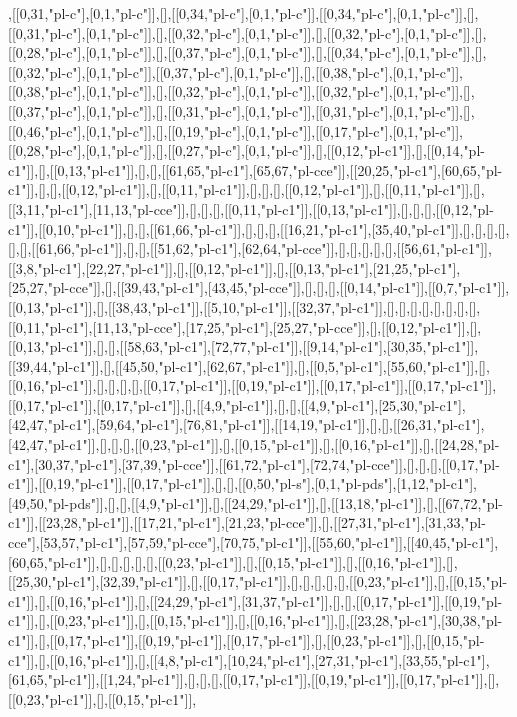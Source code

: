 ,[[0,31,"pl-c"],[0,1,"pl-c"]],[],[[0,34,"pl-c"],[0,1,"pl-c"]],[[0,34,"pl-c"],[0,1,"pl-c"]],[],[[0,31,"pl-c"],[0,1,"pl-c"]],[],[[0,32,"pl-c"],[0,1,"pl-c"]],[],[[0,32,"pl-c"],[0,1,"pl-c"]],[],[[0,28,"pl-c"],[0,1,"pl-c"]],[],[[0,37,"pl-c"],[0,1,"pl-c"]],[],[[0,34,"pl-c"],[0,1,"pl-c"]],[],[[0,32,"pl-c"],[0,1,"pl-c"]],[[0,37,"pl-c"],[0,1,"pl-c"]],[],[[0,38,"pl-c"],[0,1,"pl-c"]],[[0,38,"pl-c"],[0,1,"pl-c"]],[],[[0,32,"pl-c"],[0,1,"pl-c"]],[[0,32,"pl-c"],[0,1,"pl-c"]],[],[[0,37,"pl-c"],[0,1,"pl-c"]],[],[[0,31,"pl-c"],[0,1,"pl-c"]],[[0,31,"pl-c"],[0,1,"pl-c"]],[],[[0,46,"pl-c"],[0,1,"pl-c"]],[],[[0,19,"pl-c"],[0,1,"pl-c"]],[[0,17,"pl-c"],[0,1,"pl-c"]],[[0,28,"pl-c"],[0,1,"pl-c"]],[],[[0,27,"pl-c"],[0,1,"pl-c"]],[],[[0,12,"pl-c1"]],[],[[0,14,"pl-c1"]],[],[[0,13,"pl-c1"]],[],[],[[61,65,"pl-c1"],[65,67,"pl-cce"]],[[20,25,"pl-c1"],[60,65,"pl-c1"]],[],[],[[0,12,"pl-c1"]],[],[[0,11,"pl-c1"]],[],[],[],[[0,12,"pl-c1"]],[],[[0,11,"pl-c1"]],[],[[3,11,"pl-c1"],[11,13,"pl-cce"]],[],[],[],[[0,11,"pl-c1"]],[[0,13,"pl-c1"]],[],[],[],[[0,12,"pl-c1"]],[[0,10,"pl-c1"]],[],[],[[61,66,"pl-c1"]],[],[],[],[[16,21,"pl-c1"],[35,40,"pl-c1"]],[],[],[],[],[],[],[[61,66,"pl-c1"]],[],[],[[51,62,"pl-c1"],[62,64,"pl-cce"]],[],[],[],[],[],[[56,61,"pl-c1"]],[[3,8,"pl-c1"],[22,27,"pl-c1"]],[],[[0,12,"pl-c1"]],[],[[0,13,"pl-c1"],[21,25,"pl-c1"],[25,27,"pl-cce"]],[],[[39,43,"pl-c1"],[43,45,"pl-cce"]],[],[],[],[[0,14,"pl-c1"]],[[0,7,"pl-c1"]],[[0,13,"pl-c1"]],[],[[38,43,"pl-c1"]],[[5,10,"pl-c1"]],[[32,37,"pl-c1"]],[],[],[],[],[],[],[],[],[[0,11,"pl-c1"],[11,13,"pl-cce"],[17,25,"pl-c1"],[25,27,"pl-cce"]],[],[[0,12,"pl-c1"]],[],[[0,13,"pl-c1"]],[],[],[[58,63,"pl-c1"],[72,77,"pl-c1"]],[[9,14,"pl-c1"],[30,35,"pl-c1"]],[[39,44,"pl-c1"]],[],[[45,50,"pl-c1"],[62,67,"pl-c1"]],[],[[0,5,"pl-c1"],[55,60,"pl-c1"]],[],[[0,16,"pl-c1"]],[],[],[],[],[[0,17,"pl-c1"]],[[0,19,"pl-c1"]],[[0,17,"pl-c1"]],[[0,17,"pl-c1"]],[[0,17,"pl-c1"]],[[0,17,"pl-c1"]],[],[[4,9,"pl-c1"]],[],[],[[4,9,"pl-c1"],[25,30,"pl-c1"],[42,47,"pl-c1"],[59,64,"pl-c1"],[76,81,"pl-c1"]],[[14,19,"pl-c1"]],[],[],[[26,31,"pl-c1"],[42,47,"pl-c1"]],[],[],[],[[0,23,"pl-c1"]],[],[[0,15,"pl-c1"]],[],[[0,16,"pl-c1"]],[],[[24,28,"pl-c1"],[30,37,"pl-c1"],[37,39,"pl-cce"]],[[61,72,"pl-c1"],[72,74,"pl-cce"]],[],[],[],[[0,17,"pl-c1"]],[[0,19,"pl-c1"]],[[0,17,"pl-c1"]],[],[],[[0,50,"pl-s"],[0,1,"pl-pds"],[1,12,"pl-c1"],[49,50,"pl-pds"]],[],[],[[4,9,"pl-c1"]],[],[[24,29,"pl-c1"]],[],[[13,18,"pl-c1"]],[],[[67,72,"pl-c1"]],[[23,28,"pl-c1"]],[[17,21,"pl-c1"],[21,23,"pl-cce"]],[],[[27,31,"pl-c1"],[31,33,"pl-cce"],[53,57,"pl-c1"],[57,59,"pl-cce"],[70,75,"pl-c1"]],[[55,60,"pl-c1"]],[[40,45,"pl-c1"],[60,65,"pl-c1"]],[],[],[],[],[],[[0,23,"pl-c1"]],[],[[0,15,"pl-c1"]],[],[[0,16,"pl-c1"]],[],[[25,30,"pl-c1"],[32,39,"pl-c1"]],[],[[0,17,"pl-c1"]],[],[],[],[],[],[[0,23,"pl-c1"]],[],[[0,15,"pl-c1"]],[],[[0,16,"pl-c1"]],[],[[24,29,"pl-c1"],[31,37,"pl-c1"]],[],[],[[0,17,"pl-c1"]],[[0,19,"pl-c1"]],[],[[0,23,"pl-c1"]],[],[[0,15,"pl-c1"]],[],[[0,16,"pl-c1"]],[],[[23,28,"pl-c1"],[30,38,"pl-c1"]],[],[[0,17,"pl-c1"]],[[0,19,"pl-c1"]],[[0,17,"pl-c1"]],[],[[0,23,"pl-c1"]],[],[[0,15,"pl-c1"]],[],[[0,16,"pl-c1"]],[],[[4,8,"pl-c1"],[10,24,"pl-c1"],[27,31,"pl-c1"],[33,55,"pl-c1"],[61,65,"pl-c1"]],[[1,24,"pl-c1"]],[],[],[],[[0,17,"pl-c1"]],[[0,19,"pl-c1"]],[[0,17,"pl-c1"]],[],[[0,23,"pl-c1"]],[],[[0,15,"pl-c1"]],